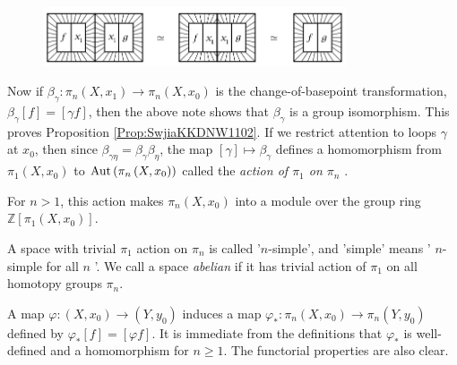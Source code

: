 \begin{definition}
\begin{note}
      \begin{figure}[htpb]
          \centering
          \includegraphics[width=0.8\textwidth]{Figures/WIWIWSSK11.png}
          \caption{}
          \label{fig:WIWIWSSK11-png}
      \end{figure}
  \end{note}

  Now if $\beta_{\gamma} \colon \pi_n(X,x_1) \to 
  \pi_n(X, x_0)$ is the change-of-basepoint transformation,
   $\beta_{\gamma}\left[ f \right] =
   \left[ \gamma f \right] $, then
   the above note shows that $\beta_\gamma$ is a group isomorphism.
   This proves Proposition \ref{Prop:SwjiaKKDNW1102}. 
   If we restrict attention to loops
   $\gamma$ at $x_0$, then since $\beta_{\gamma \eta}=
   \beta_{\gamma} \beta_{\eta}$, the map
   $\left[ \gamma \right] \mapsto \beta_{\gamma}$ 
   defines a homomorphism from
   $\pi_1\left( X, x_0 \right) $ to
   $\operatorname{Aut} \left( \pi_n \left( X,x_0 \right)  \right) $ 
   called the \textit{action of $\pi_1$ on $\pi_n$ }.
  \end{definition}

  \begin{note}
  For $n>1$, this action makes
  $\pi_n(X,x_0)$ into a module over the group ring
  $\mathbb{Z}\left[ \pi_1 \left( X,x_0 \right)  \right] $.
  \end{note}  

  \begin{definition}
      A space with trivial $\pi_1$ action on $\pi_n$ is called
      '$n$-simple', and 'simple' means
      ' $n$-simple for all $n$ '. We call
      a space \textit{abelian} if it has
      trivial action of $\pi_1$ on all homotopy groups
      $\pi_n$.
  \end{definition}

  \begin{proposition}[$\pi_n$ is a functor]
      A map $\varphi  \colon \left( X, x_0 \right) \to 
      \left( Y, y_0 \right) $ induces a map
      $\varphi_* \colon \pi_n \left( X, x_0 \right) \to 
      \pi_n \left( Y, y_0 \right) $ defined by
      $\varphi_* \left[ f \right] = \left[ \varphi  f \right] $.
      It is immediate from the definitions that
      $\varphi_*$ is well-defined and a homomorphism
      for $n\ge 1$. The functorial properties are also clear.
  \end{proposition}

